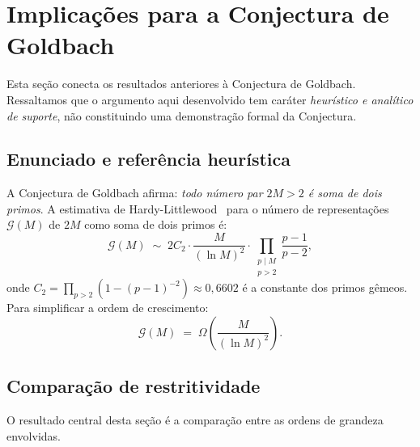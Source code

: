 \documentclass{article}
\begin{document}
	\section{Implicações para a Conjectura de Goldbach}
	\label{sec:goldbach}
	
	Esta seção conecta os resultados anteriores à Conjectura de Goldbach.
	Ressaltamos que o argumento aqui desenvolvido tem caráter
	\emph{heurístico e analítico de suporte}, não constituindo
	uma demonstração formal da Conjectura.
	
	\subsection{Enunciado e referência heurística}
	
	A Conjectura de Goldbach afirma: \emph{todo número par $2M > 2$
		é soma de dois primos}. A estimativa de Hardy-Littlewood~\cite{hardylittlewood1923}
	para o número de representações $\mathcal{G}(M)$ de $2M$ como
	soma de dois primos é:
	\[
	\mathcal{G}(M)
	\;\sim\; 2C_2 \cdot \frac{M}{(\ln M)^2}
	\cdot \prod_{\substack{p \mid M \\ p > 2}}
	\frac{p-1}{p-2},
	\]
	onde $C_2 = \prod_{p>2}(1 - (p-1)^{-2}) \approx 0{,}6602$ é a
	constante dos primos gêmeos. Para simplificar a ordem de crescimento:
	\[
	\mathcal{G}(M) \;=\; \Omega\!\left(\frac{M}{(\ln M)^2}\right).
	\]
	
	\subsection{Comparação de restritividade}
	
	O resultado central desta seção é a comparação entre as ordens
	de grandeza envolvidas.
	
\end{document}
